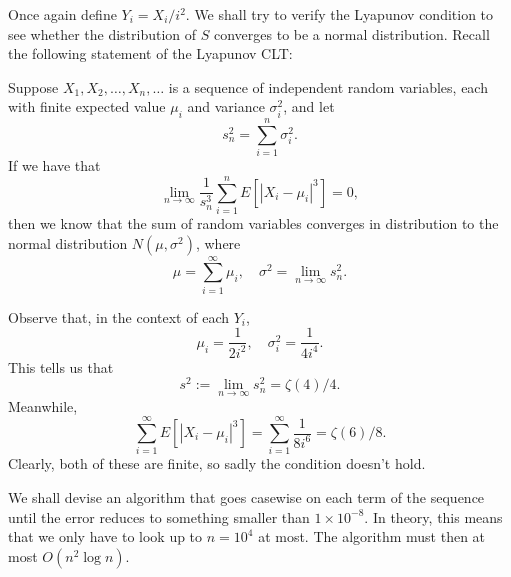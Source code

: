 \documentclass[a4paper, 12pt]{article}
\begin{document}
\begin{solution}
    Once again define \( Y_i = X_i / i^2 \). We shall try to verify the Lyapunov condition to see whether the distribution of \( S \) converges to be a normal distribution. Recall the following statement of the Lyapunov CLT:
    \begin{chirpbox}
    \begin{theorem}
        Suppose \( X_1, X_2, \ldots, X_n, \ldots \) is a sequence of independent random variables, each with finite expected value \( \mu_i \) and variance \( \sigma^2_i \), and let
        \[
            s_n^2 = \sum_{i = 1}^{n} \sigma_i^2
        .\]
        If we have that
        \[
            \lim_{n \to \infty} \frac{1}{s_n^3} \sum_{i = 1}^{n} E \left[ \left\lvert X_i - \mu_i \right\rvert^3 \right] = 0
        ,\]
        then we know that the sum of random variables converges in distribution to the normal distribution \( N(\mu, \sigma^2) \), where
        \[
            \mu = \sum_{i = 1}^{\infty} \mu_i, \quad \sigma^2 = \lim_{n \to \infty} s_n^2
        .\]
    \end{theorem}
    \end{chirpbox}
    Observe that, in the context of each \( Y_i \),
    \[
        \mu_i = \frac{1}{2i^2}, \quad \sigma_i^2 = \frac{1}{4i^4} 
    .\]
    This tells us that
    \[
        s^2 := \lim_{n \to \infty} s^2_n = \zeta (4) / 4
    .\]
    Meanwhile,
    \[
        \sum_{i = 1}^{\infty} E \left[ \left\lvert X_i - \mu_i \right\rvert^3 \right] = \sum_{i = 1}^{\infty} \frac{1}{8 i^6} = \zeta(6) / 8
    .\]
    Clearly, both of these are finite, so sadly the condition doesn't hold.
\end{solution}

\begin{solution}
    We shall devise an algorithm that goes casewise on each term of the sequence until the error reduces to something smaller than \( 1 \times 10^{-8} \). In theory, this means that we only have to look up to \( n = 10^4 \) at most. The algorithm must then at most \( O(n^2 \log n) \).
\end{solution}
\end{document}
